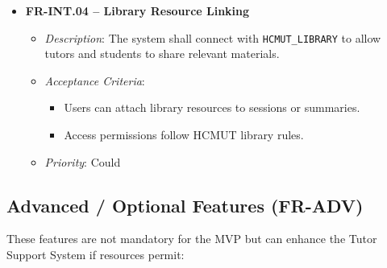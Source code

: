 \begin{itemize}
    \item \textbf{FR-INT.04 – Library Resource Linking}
        \begin{itemize}
            \item \textit{Description}: The system shall connect with \texttt{HCMUT\_LIBRARY} to allow tutors and students to share relevant materials.
            \item \textit{Acceptance Criteria}:
                \begin{itemize}
                    \item Users can attach library resources to sessions or summaries.
                    \item Access permissions follow HCMUT library rules.
                \end{itemize} 
            \item \textit{Priority}: Could
        \end{itemize}
\end{itemize}

\subsection{Advanced / Optional Features (FR-ADV)}
These features are not mandatory for the MVP but can enhance the Tutor Support System if resources permit:

